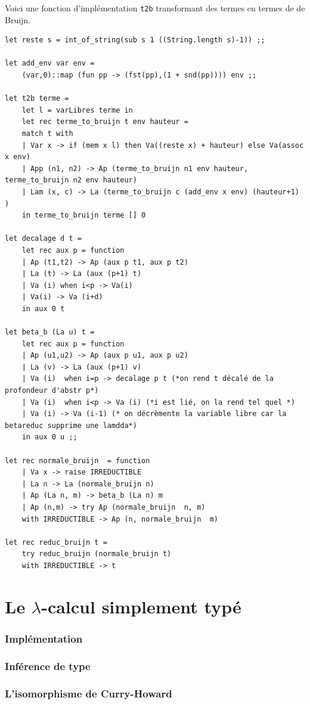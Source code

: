 \documentclass[11pt]{book}
\begin{document}
Voici une fonction d'implémentation \verb+t2b+ transformant des termes en termes de de Bruijn.
\begin{Verbatim}
let reste s = int_of_string(sub s 1 ((String.length s)-1)) ;;

let add_env var env =
	(var,0)::map (fun pp -> (fst(pp),(1 + snd(pp)))) env ;;

let t2b terme =
	let l = varLibres terme in
	let rec terme_to_bruijn t env hauteur =
	match t with
	| Var x -> if (mem x l) then Va((reste x) + hauteur) else Va(assoc x env)
	| App (n1, n2) -> Ap (terme_to_bruijn n1 env hauteur, terme_to_bruijn n2 env hauteur) 
	| Lam (x, c) -> La (terme_to_bruijn c (add_env x env) (hauteur+1) )
	in terme_to_bruijn terme [] 0

let decalage d t =
	let rec aux p = function
	| Ap (t1,t2) -> Ap (aux p t1, aux p t2) 
	| La (t) -> La (aux (p+1) t)
	| Va (i) when i<p -> Va(i)
	| Va(i) -> Va (i+d)
	in aux 0 t

let beta_b (La u) t =
	let rec aux p = function
	| Ap (u1,u2) -> Ap (aux p u1, aux p u2)
	| La (v) -> La (aux (p+1) v)
	| Va (i)  when i=p -> decalage p t (*on rend t décalé de la profondeur d'abstr p*)
	| Va (i)  when i<p -> Va (i) (*i est lié, on la rend tel quel *)
	| Va (i) -> Va (i-1) (* on décrèmente la variable libre car la betareduc supprime une lamdda*)
	in aux 0 u ;;

let rec normale_bruijn  = function
	| Va x -> raise IRREDUCTIBLE
	| La n -> La (normale_bruijn n)
	| Ap (La n, m) -> beta_b (La n) m
	| Ap (n,m) -> try Ap (normale_bruijn  n, m)
	with IRREDUCTIBLE -> Ap (n, normale_bruijn  m)

let rec reduc_bruijn t =
	try reduc_bruijn (normale_bruijn t)
	with IRREDUCTIBLE -> t 
\end{Verbatim}

\section{Le $\lambda$-calcul simplement typé}
\subsubsection{Implémentation}
\subsubsection{Inférence de type}
\subsubsection{L'isomorphisme de Curry-Howard}
\end{document}
